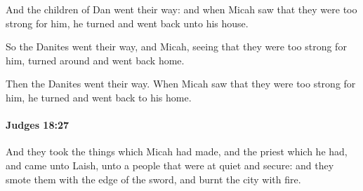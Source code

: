			\begin{versebox}
					\item[BHS] 
					\item[ASV] And the children of Dan went their way: and when Micah saw that they were too strong for him, he turned and went back unto his house.
					\item[NIV] So the Danites went their way, and Micah, seeing that they were too strong for him, turned around and went back home.
					\item[NRSV] Then the Danites went their way. When Micah saw that they were too strong for him, he turned and went back to his home.
			\end{versebox}

		\paragraph{Judges 18:27} %
			\label{JUDGES-18-27}

			And they took the things which Micah had made, and the priest which he had, and came unto Laish, unto a people that were at quiet and secure: and they smote them with the edge of the sword, and burnt the city with fire.


